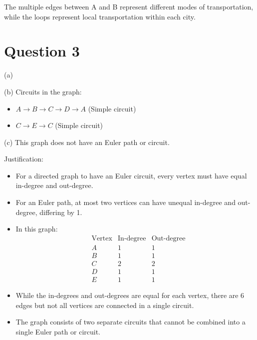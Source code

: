 \documentclass{article}
\begin{document}
The multiple edges between A and B represent different modes of transportation, while the loops represent local transportation within each city.

\section*{Question 3}
(a) 

(b) Circuits in the graph:
   \begin{itemize}
    \item $A \rightarrow B \rightarrow C \rightarrow D \rightarrow A$ (Simple circuit)
    \item $C \rightarrow E \rightarrow C$ (Simple circuit)
   \end{itemize}

(c) This graph does not have an Euler path or circuit.

   Justification:
   \begin{itemize}
    \item For a directed graph to have an Euler circuit, every vertex must have equal in-degree and out-degree.
    \item For an Euler path, at most two vertices can have unequal in-degree and out-degree, differing by 1.
    \item In this graph:
      \begin{align*}
        &\text{Vertex} &\text{In-degree} &\text{Out-degree} \\
        &A &1 &1 \\
        &B &1 &1 \\
        &C &2 &2 \\
        &D &1 &1 \\
        &E &1 &1
      \end{align*}
    \item While the in-degrees and out-degrees are equal for each vertex, there are 6 edges but not all vertices are connected in a single circuit.
    \item The graph consists of two separate circuits that cannot be combined into a single Euler path or circuit.
   \end{itemize}
\end{document}
